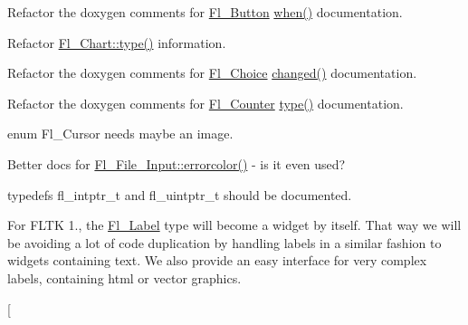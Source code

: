 \begin{DoxyRefList}
Refactor the doxygen comments for \hyperlink{class_fl___button}{Fl\+\_\+\+Button} \hyperlink{class_fl___widget_ad4ef380ffb50f4d00fe93f7b6677e9e1}{when()} documentation. 
\item[\label{todo__todo000010}%
\Hypertarget{todo__todo000010}%
Class \hyperlink{class_fl___chart}{Fl\+\_\+\+Chart} ]Refactor \hyperlink{class_fl___widget_adda2e8f162b3ea0332eb8d762350bbd5}{Fl\+\_\+\+Chart\+::type()} information. 
\item[\label{todo__todo000011}%
\Hypertarget{todo__todo000011}%
Class \hyperlink{class_fl___choice}{Fl\+\_\+\+Choice} ]Refactor the doxygen comments for \hyperlink{class_fl___choice}{Fl\+\_\+\+Choice} \hyperlink{class_fl___widget_af007a3c83ac176a7511df8df0706947c}{changed()} documentation. 
\item[\label{todo__todo000012}%
\Hypertarget{todo__todo000012}%
Class \hyperlink{class_fl___counter}{Fl\+\_\+\+Counter} ]Refactor the doxygen comments for \hyperlink{class_fl___counter}{Fl\+\_\+\+Counter} \hyperlink{class_fl___widget_adda2e8f162b3ea0332eb8d762350bbd5}{type()} documentation. 
\item[\label{todo__todo000005}%
\Hypertarget{todo__todo000005}%
Member \hyperlink{_enumerations_8_h_a72bde974edc7926b1217dd51b8c7e8e0}{Fl\+\_\+\+Cursor} ]enum Fl\+\_\+\+Cursor needs maybe an image.  
\item[\label{todo__todo000016}%
\Hypertarget{todo__todo000016}%
Member \hyperlink{class_fl___file___input_a7e5f2f3b29dccd1ecee9426c07cd5df1}{Fl\+\_\+\+File\+\_\+\+Input\+:\+:errorcolor} () const]Better docs for \hyperlink{class_fl___file___input_a7e5f2f3b29dccd1ecee9426c07cd5df1}{Fl\+\_\+\+File\+\_\+\+Input\+::errorcolor()} -\/ is it even used?  
\item[\label{todo__todo000020}%
\Hypertarget{todo__todo000020}%
Member \hyperlink{_fl___widget_8_h_a6c7d27e81f16857f18da5e4ce097de75}{fl\+\_\+intptr\+\_\+t} ]typedef\textquotesingle{}s fl\+\_\+intptr\+\_\+t and fl\+\_\+uintptr\+\_\+t should be documented.  
\item[\label{todo__todo000021}%
\Hypertarget{todo__todo000021}%
Class \hyperlink{struct_fl___label}{Fl\+\_\+\+Label} ]For F\+L\+TK 1., the \hyperlink{struct_fl___label}{Fl\+\_\+\+Label} type will become a widget by itself. That way we will be avoiding a lot of code duplication by handling labels in a similar fashion to widgets containing text. We also provide an easy interface for very complex labels, containing html or vector graphics.  
\item[\label{todo__todo000004}%
%

\end{DoxyRefList}
